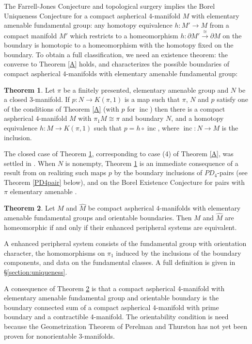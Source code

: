 \documentclass[12pt]{amsart}
\theoremstyle{definition}
\newtheorem{maintheorem}{Theorem}
\DeclareMathOperator{\inc}{inc}
\begin{document}
The Farrell-Jones Conjecture and topological surgery implies the Borel Uniqueness Conjecture for a compact aspherical 4-manifold $M$ with elementary amenable fundamental group:  any homotopy equivalence $h : M' \to M$ from a compact manifold $M'$ which restricts to a homeomorphism $h : \partial M' \xrightarrow{\cong} \partial M$ on the boundary is homotopic to a homeomorphism with the homotopy fixed on the boundary.  To obtain a full classification, we need an existence theorem: the converse to Theorem \ref{A} holds, and characterizes the possible boundaries of compact aspherical 4-manifolds with elementary amenable fundamental group:

\begin{maintheorem} \label{B}
Let $\pi$ be a finitely presented, elementary amenable group and $N$ be a closed $3$-manifold.
If $p:N\to{K(\pi,1)}$ is a map such that $\pi$, $N$ and $p$ satisfy
one of the conditions of Theorem \ref{A} (with $p$ for $\inc$) 
then there is a compact aspherical $4$-manifold $M$ with $\pi_1M\cong\pi$ and
boundary $N$, and a homotopy equivalence $h:M\to K(\pi,1)$ such that
$p=h\circ\inc$, where $\inc:N\to{M}$ is the inclusion.
\end{maintheorem}

The closed case of Theorem \ref{B}, corresponding to case (4) of Theorem \ref{A},
was settled in \cite{AJ}.
When $N$ is nonempty,  
Theorem \ref{B} is an immediate consequence of a result from \cite{dh1} on 
realizing such maps $p$ by the boundary inclusions of $PD_4$-pairs
(see Theorem \ref{PD4pair} below),
and on the Borel Existence Conjecture for pairs with $\pi$ elementary amenable \cite{dh1}. 

\begin{maintheorem} \label{C}
Let $M$ and $\widehat{M}$ be compact aspherical $4$-manifolds with elementary amenable fundamental groups
and orientable boundaries.
Then $M$ and $\widehat{M}$ are homeomorphic if and only if
their enhanced peripheral systems are equivalent.
\end{maintheorem}
 
A enhanced peripheral system consists of the fundamental group with orientation character,
the homomorphisms on $\pi_1$ induced by the inclusions 
of the boundary components, and data on the fundamental classes.
A full definition is given in \S\ref{section:uniqueness}.

A consequence of Theorem \ref{C} is that a compact aspherical 4-manifold with elementary amenable fundamental group 
and orientable boundary 
is the boundary connected sum of a compact aspherical 4-manifold 
with prime boundary and a contractible 4-manifold.
The orientability condition is need  because the Geometrization Theorem of 
Perelman and Thurston has not yet been proven for nonorientable 
3-manifolds.
\end{document}
